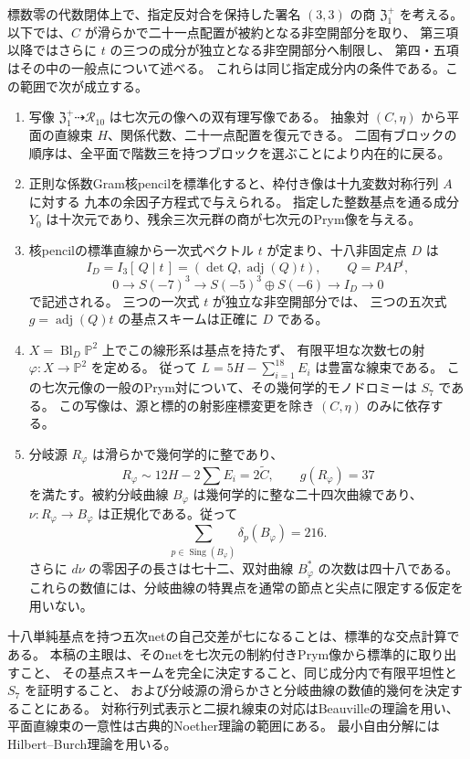 \begin{theorem}[復元、像の方程式と七次被覆]
\label{thm:sextic-main-v29}
標数零の代数閉体上で、指定反対合を保持した署名 $(3,3)$ の商 $\mathfrak Z_1^+$ を考える。
以下では、$C$ が滑らかで二十一点配置が被約となる非空開部分を取り、
第三項以降ではさらに $t$ の三つの成分が独立となる非空開部分へ制限し、
第四・五項はその中の一般点について述べる。
これらは同じ指定成分内の条件である。この範囲で次が成立する。
\begin{enumerate}
\item 写像 $\mathfrak Z_1^+\dashrightarrow\mathcal R_{10}$ は七次元の像への双有理写像である。
抽象対 $(C,\eta)$ から平面の直線束 $H$、関係代数、二十一点配置を復元できる。
二固有ブロックの順序は、全平面で階数三を持つブロックを選ぶことにより内在的に戻る。
\item 正則な係数Gram核pencilを標準化すると、枠付き像は十九変数対称行列 $A$ に対する
九本の余因子方程式で与えられる。
指定した整数基点を通る成分 $Y_0$ は十次元であり、残余三次元群の商が七次元のPrym像を与える。
\item 核pencilの標準直線から一次式ベクトル $t$ が定まり、十八非固定点 $D$ は
\[
 I_D=I_3[\,Q\mid t\,]=(\det Q,\operatorname{adj}(Q)t),\qquad Q=PAP^t,
\]
\[
 0\to S(-7)^3\to S(-5)^3\oplus S(-6)\to I_D\to0
\]
で記述される。
三つの一次式 $t$ が独立な非空開部分では、
三つの五次式 $g=\operatorname{adj}(Q)t$ の基点スキームは正確に $D$ である。
\item $X=\operatorname{Bl}_D\mathbb P^2$ 上でこの線形系は基点を持たず、
有限平坦な次数七の射 $\varphi:X\to\mathbb P^2$ を定める。
従って $L=5H-\sum_{i=1}^{18}E_i$ は豊富な線束である。
この七次元像の一般のPrym対について、その幾何学的モノドロミーは $S_7$ である。
この写像は、源と標的の射影座標変更を除き $(C,\eta)$ のみに依存する。
\item 分岐源 $R_\varphi$ は滑らかで幾何学的に整であり、
\[
 R_\varphi\sim12H-2\sum E_i=2\widetilde C,
 \qquad g(R_\varphi)=37
\]
を満たす。被約分岐曲線 $B_\varphi$ は幾何学的に整な二十四次曲線であり、
$\nu:R_\varphi\to B_\varphi$ は正規化である。従って
\[
 \sum_{p\in\operatorname{Sing}(B_\varphi)}\delta_p(B_\varphi)=216.
\]
さらに $d\nu$ の零因子の長さは七十二、双対曲線 $B_\varphi^*$ の次数は四十八である。
これらの数値には、分岐曲線の特異点を通常の節点と尖点に限定する仮定を用いない。
\end{enumerate}
\end{theorem}

十八単純基点を持つ五次netの自己交差が七になることは、標準的な交点計算である。
本稿の主眼は、そのnetを七次元の制約付きPrym像から標準的に取り出すこと、
その基点スキームを完全に決定すること、同じ成分内で有限平坦性と $S_7$ を証明すること、
および分岐源の滑らかさと分岐曲線の数値的幾何を決定することにある。
対称行列式表示と二捩れ線束の対応はBeauvilleの理論\cite{BeauvilleDeterminantal}を用い、
平面直線束の一意性は古典的Noether理論\cite{HartshorneNoether,CoppensKatoPlaneSystems}の範囲にある。
最小自由分解にはHilbert--Burch理論を用いる\cite{EisenbudSidman}。

